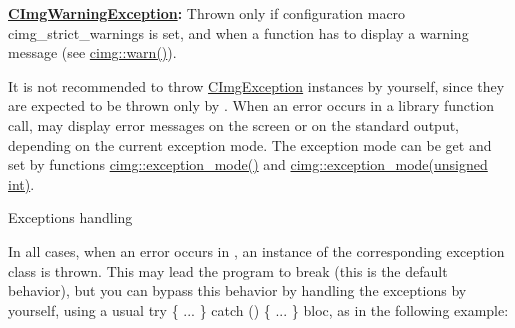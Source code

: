 \begin{DoxyItemize}
\item {\bfseries \hyperlink{structcimg__library__suffixed_1_1CImgWarningException}{C\+Img\+Warning\+Exception}\+:} Thrown only if configuration macro {\ttfamily cimg\+\_\+strict\+\_\+warnings} is set, and when a  function has to display a warning message (see \hyperlink{namespacecimg__library__suffixed_1_1cimg_acfd3624d72ed7f79c82ec45646c685e7}{cimg\+::warn()}).
\end{DoxyItemize}

It is not recommended to throw \hyperlink{structcimg__library__suffixed_1_1CImgException}{C\+Img\+Exception} instances by yourself, since they are expected to be thrown only by . When an error occurs in a library function call,  may display error messages on the screen or on the standard output, depending on the current  exception mode. The  exception mode can be get and set by functions \hyperlink{namespacecimg__library__suffixed_1_1cimg_aeafab144366eddd11360f32f468fa4af}{cimg\+::exception\+\_\+mode()} and \hyperlink{namespacecimg__library__suffixed_1_1cimg_aeafab144366eddd11360f32f468fa4af}{cimg\+::exception\+\_\+mode(unsigned int)}.

\begin{DoxyParagraph}{Exceptions handling}

\end{DoxyParagraph}
In all cases, when an error occurs in , an instance of the corresponding exception class is thrown. This may lead the program to break (this is the default behavior), but you can bypass this behavior by handling the exceptions by yourself, using a usual {\ttfamily try \{ ... \} catch () \{ ... \}} bloc, as in the following example\+: 
 

